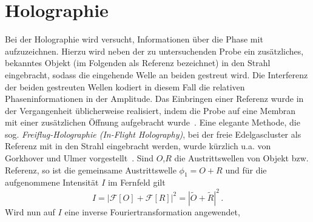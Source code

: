 \section{Holographie}
Bei der Holographie wird versucht, Informationen über die Phase mit aufzuzeichnen. Hierzu wird neben der zu untersuchenden Probe ein zusätzliches, bekanntes Objekt (im Folgenden als Referenz bezeichnet) in den Strahl eingebracht, sodass die eingehende Welle an beiden gestreut wird. Die Interferenz der beiden gestreuten Wellen kodiert in diesem Fall die relativen Phaseninformationen in der Amplitude.
Das Einbringen einer Referenz wurde in der Vergangenheit üblicherweise realisiert, indem die Probe auf eine Membran mit einer zusätzlichen Öffnung aufgebracht wurde~\cite{eisebitt2004}. Eine elegante Methode, die sog. \textit{Freiflug-Holographie (In-Flight Holography)}, bei der freie Edelgascluster als Referenz mit in den Strahl eingebracht werden, wurde kürzlich u.a. von Gorkhover und Ulmer vorgestellt~\cite{gorkhover2016,ulmer2015}.
Sind $O$,$R$ die Austrittswellen von Objekt bzw. Referenz, so ist  die gemeinsame Austrittswelle $\phi_1=O+R$ und für die aufgenommene Intensität $I$ im Fernfeld gilt
\begin{equation}
	I=\left|\mathscr{F}\left[O\right]+\mathscr{F}\left[R\right]\right|^2=\left|\tilde{O}+\tilde{R}\right|^2\,.
\end{equation}
Wird nun auf $I$ eine inverse Fouriertransformation angewendet,

